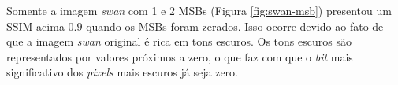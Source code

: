 Somente a imagem \textit{swan} com 1 e 2 MSBs (Figura \ref{fig:swan-msb}) presentou um SSIM acima $0.9$ quando os MSBs foram zerados. Isso ocorre devido ao fato de que a imagem \textit{swan} original é rica em tons escuros. Os tons escuros são representados por valores próximos a zero, o que faz com que o \textit{bit} mais significativo dos \textit{pixels} mais escuros já seja zero.
